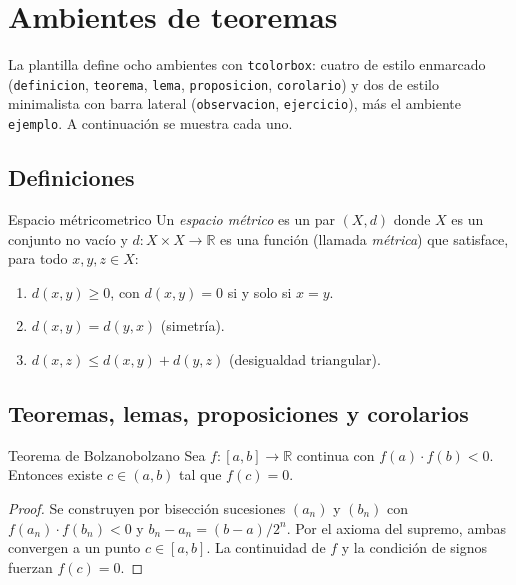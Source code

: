 \documentclass[letterpaper, 11pt]{article}
\newcommand{\R}{\ensuremath{\mathbb{R}}}
\begin{document}
\section{Ambientes de teoremas}\label{sec:teoremas}

La plantilla define ocho ambientes con \texttt{tcolorbox}: cuatro de
estilo enmarcado (\texttt{definicion}, \texttt{teorema}, \texttt{lema},
\texttt{proposicion}, \texttt{corolario}) y dos de estilo minimalista
con barra lateral (\texttt{observacion}, \texttt{ejercicio}), más el
ambiente \texttt{ejemplo}. A continuación se muestra cada uno.

\subsection{Definiciones}

\begin{definicion}{Espacio métrico}{metrico}
    Un \emph{espacio métrico} es un par $(X, d)$ donde $X$ es un
    conjunto no vacío y $d\colon X \times X \to \R$ es una función
    (llamada \emph{métrica}) que satisface, para todo $x, y, z \in X$:
    \begin{enumerate}[label=(\roman*)]
        \item $d(x, y) \geq 0$, con $d(x,y) = 0$ si y solo si $x = y$.
        \item $d(x, y) = d(y, x)$ \hfill (simetría).
        \item $d(x, z) \leq d(x, y) + d(y, z)$ \hfill (desigualdad triangular).
    \end{enumerate}
\end{definicion}

\subsection{Teoremas, lemas, proposiciones y corolarios}

\begin{teorema}{Teorema de Bolzano}{bolzano}
    Sea $f\colon [a,b] \to \R$ continua con $f(a) \cdot f(b) < 0$.
    Entonces existe $c \in (a, b)$ tal que $f(c) = 0$.
\end{teorema}

\begin{proof}
    Se construyen por bisección sucesiones $(a_n)$ y $(b_n)$ con
    $f(a_n) \cdot f(b_n) < 0$ y $b_n - a_n = (b - a)/2^n$. Por el
    axioma del supremo, ambas convergen a un punto $c \in [a,b]$.
    La continuidad de $f$ y la condición de signos fuerzan $f(c) = 0$.
\end{proof}
\end{document}

